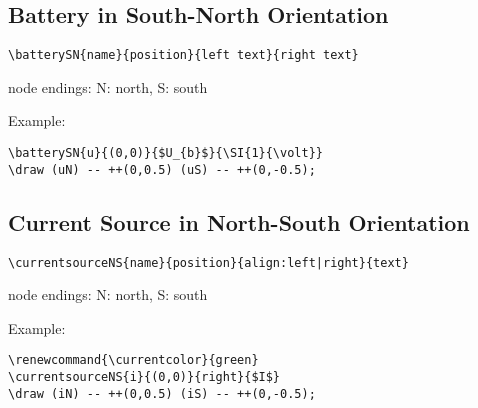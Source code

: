 \documentclass[parskip=full]{scrartcl}
\begin{document}
\subsection{Battery in South-North Orientation}

\begin{verbatim}
\batterySN{name}{position}{left text}{right text}
\end{verbatim}
node endings: N: north, S: south

Example:\\
\begin{minipage}{0.8\textwidth}
\begin{verbatim}
\batterySN{u}{(0,0)}{$U_{b}$}{\SI{1}{\volt}}
\draw (uN) -- ++(0,0.5) (uS) -- ++(0,-0.5);
\end{verbatim}
\end{minipage}
\begin{minipage}{0.19\textwidth}
\end{minipage}

\subsection{Current Source in North-South Orientation}

\begin{verbatim}
\currentsourceNS{name}{position}{align:left|right}{text}
\end{verbatim}
node endings: N: north, S: south

Example:\\
\begin{minipage}{0.8\textwidth}
\begin{verbatim}
\renewcommand{\currentcolor}{green}
\currentsourceNS{i}{(0,0)}{right}{$I$}
\draw (iN) -- ++(0,0.5) (iS) -- ++(0,-0.5);
\end{verbatim}
\end{minipage}
\begin{minipage}{0.19\textwidth}
\end{minipage}
\end{document}

